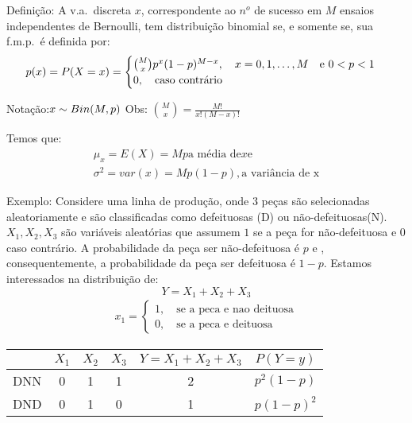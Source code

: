  \begin{description}
   \item{Definição}: A v.a.\ discreta $x$, correspondente ao $n^o$ de sucesso em $M$ ensaios
     independentes de Bernoulli, tem distribuição binomial se, e somente se, sua 
     f.m.p.\ é definida por: 
     \begin{align}
       p(x)=P(X=x)=\begin{cases}
         \binom{M}{x}p^x (1-p)^{M-x}, \text{\quad}x=0,1,\dots,M \text{\quad e }0<p<1\\
         0, \text{\quad caso contrário}
       \end{cases}
     \end{align}

   \item{Notação}:$ x \sim Bin(M,p)\\$
     Obs: $\binom{M}{x}=\frac{M!}{x!(M-x)!}$

     Temos que: 
     \begin{align}
       \mu_{x}=E(X)=Mp\text{a média de} x \text{e}\\
       \sigma^2 =var(x)=Mp(1-p), \text{a variância de x}
     \end{align}
   \item{Exemplo}: Considere uma linha de produção, onde 3 peças são selecionadas aleatoriamente
     e são classificadas como defeituosas (D) ou não-defeituosas(N). $X_{1},X_{2},X_{3}$
     são variáveis aleatórias que assumem $1$ se a peça for não-defeituosa e $0$ caso 
     contrário. A probabilidade da peça ser não-defeituosa é $p$ e , consequentemente, 
     a probabilidade da peça ser defeituosa é $1-p$. Estamos interessados na distribuição
     de:
     $$Y=X_{1}+X_{2}+X_{3}$$
     \begin{align*}
       x_1 = \begin{cases}
         1, \quad \text{se a peca e nao deituosa}\\
         0, \quad \text{se a peca e deituosa}
       \end{cases}
     \end{align*}
     \begin{tabular}{c c c c c c }
       \toprule
       & $X_1$  & $X_2$ & $X_3$   & $Y= X_1 +X_2+ X_3$ & $ P(Y=y)$\\ \midrule
       DNN &0 & 1 & 1 & 2 & $p^2(1-p)$\\\midrule

       DND& 0 & 1 & 0 & 1 & $p(1-p)^2$\\\midrule


\end{tabular}
\end{description}
